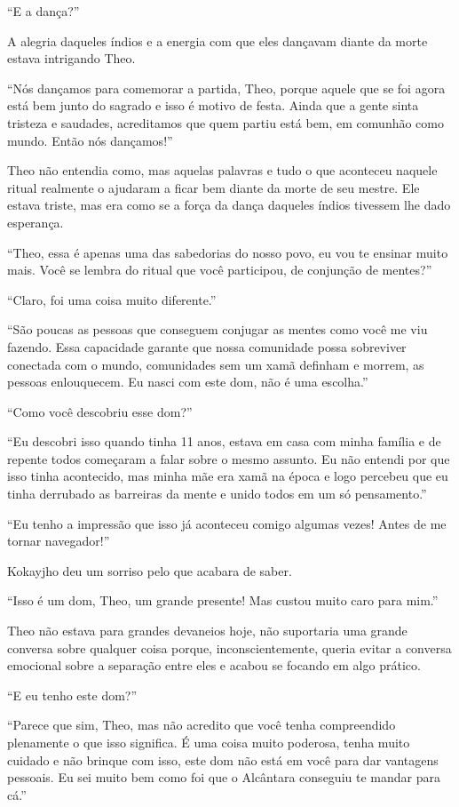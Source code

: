 ``E a dança?''

A alegria daqueles índios e a energia com que eles dançavam diante da
morte estava intrigando Theo.

``Nós dançamos para comemorar a partida, Theo, porque aquele que se foi
agora está bem junto do sagrado e isso é motivo de festa. Ainda que a
gente sinta tristeza e saudades, acreditamos que quem partiu está bem,
em comunhão como mundo. Então nós dançamos!''

Theo não entendia como, mas aquelas palavras e tudo o que aconteceu
naquele ritual realmente o ajudaram a ficar bem diante da morte de seu
mestre. Ele estava triste, mas era como se a força da dança daqueles
índios tivessem lhe dado esperança.

``Theo, essa é apenas uma das sabedorias do nosso povo, eu vou te
ensinar muito mais. Você se lembra do ritual que você participou, de
conjunção de mentes?''

``Claro, foi uma coisa muito diferente.''

``São poucas as pessoas que conseguem conjugar as mentes como você me
viu fazendo. Essa capacidade garante que nossa comunidade possa
sobreviver conectada com o mundo, comunidades sem um xamã definham e
morrem, as pessoas enlouquecem. Eu nasci com este dom, não é uma
escolha.''

``Como você descobriu esse dom?''

``Eu descobri isso quando tinha 11 anos, estava em casa com minha
família e de repente todos começaram a falar sobre o mesmo assunto. Eu
não entendi por que isso tinha acontecido, mas minha mãe era xamã na
época e logo percebeu que eu tinha derrubado as barreiras da mente e
unido todos em um só pensamento.''

``Eu tenho a impressão que isso já aconteceu comigo algumas vezes! Antes
de me tornar navegador!''

Kokayjho deu um sorriso pelo que acabara de saber.

``Isso é um dom, Theo, um grande presente! Mas custou muito caro para
mim.''

Theo não estava para grandes devaneios hoje, não suportaria uma grande
conversa sobre qualquer coisa porque, inconscientemente, queria evitar a
conversa emocional sobre a separação entre eles e acabou se focando em
algo prático.

``E eu tenho este dom?''

``Parece que sim, Theo, mas não acredito que você tenha compreendido
plenamente o que isso significa. É uma coisa muito poderosa, tenha muito
cuidado e não brinque com isso, este dom não está em você para dar
vantagens pessoais. Eu sei muito bem como foi que o Alcântara conseguiu
te mandar para cá.''

